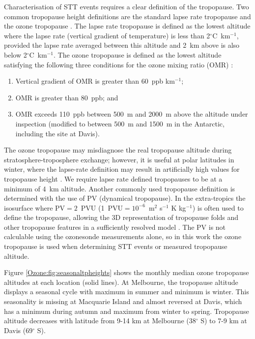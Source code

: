     Characterisation of STT events requires a clear definition of the tropopause.
    Two common tropopause height definitions are the standard lapse rate tropopause \citep{WMO1957} and the ozone tropopause \citep{Bethan1996}.
    The lapse rate tropopause is defined as the lowest altitude where the lapse rate (vertical gradient of temperature) is less than 2$^\circ$C~km$^{-1}$, provided the lapse rate averaged between this altitude and 2~km above is also below 2$^\circ$C~km$^{-1}$.
    The ozone tropopause is defined as the lowest altitude satisfying the following three conditions for the ozone mixing ratio (OMR) \citep{Bethan1996}:
    \begin{enumerate}
      \item Vertical gradient of OMR is greater than 60~ppb km$^{-1}$;
      \item OMR is greater than 80~ppb; and
      \item OMR exceeds 110~ppb between 500~m and 2000~m above the altitude under inspection (modified to between 500~m and 1500~m in the Antarctic, including the site at Davis).
    \end{enumerate}
    The ozone tropopause may misdiagnose the real tropopause altitude during stratosphere-troposphere exchange; however, it is useful at polar latitudes in winter, where the lapse-rate definition may result in artificially high values for tropopause height \citep{Bethan1996, Tomikawa2009, Alexander2013}.
    We require lapse rate defined tropopauses to be at a minimum of 4~km altitude. %
    Another commonly used tropopause definition is determined with the use of PV (dynamical tropopause).
    In the extra-tropics the isosurface where PV$=2$~PVU (1~PVU$= 10^{-6}$~m$^2$ s$^{-1}$ K kg$^{-1}$) is often used to define the tropopause, allowing the 3D representation of tropopause folds and other tropopause features in a sufficiently resolved model \citep{Skerlak2014,Tyrlis2014}.
    The PV is not calculable using the ozonesonde measurements alone, so in this work the ozone tropopause is used when determining STT events or measured tropopause altitude.
    
    Figure \ref{Ozone:fig:seasonaltpheights} shows the monthly median ozone tropopause altitudes at each location (solid lines).
    At Melbourne, the tropopause altitude displays a seasonal cycle with maximum in summer and minimum is winter.
    This seasonality is missing at Macquarie Island and almost reversed at Davis, which has a minimum during autumn and maximum from winter to spring.
    Tropopause altitude decreases with latitude from 9-14 km at Melbourne (38$^\circ$ S) to 7-9 km at Davis (69$^\circ$ S).
    
